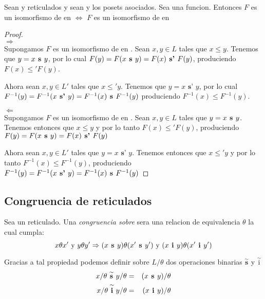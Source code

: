 \begin{lemma}
  Sean \reticulAlg y  reticulados y sean  y 
  los posets asociados. Sea  una funcion. Entonces $F$ es un isomorfismo de
  \reticulAlg en  $\iff$ $F$ es un isomorfismo de  en 
\end{lemma}
\begin{proof}
  ${}$\\
  $\Rightarrow$\\
  Supongamos $F$ es un isomorfismo de \reticulAlg en . Sean $x, y \in L$ tales que $x \leq y$.
  Tenemos que $y = x\textbf{ s }y$, por lo cual $F(y) = F(x\textbf{ s }y) = F(x) \textbf{ s' }F(y)$, produciendo $F(x) \leq' F(y)$.
  
  Ahora sean $x, y \in L'$ tales que $x \leq' y$. Tenemos que $y = x \textbf{ s' } y$, por lo cual $F^{-1}(y) = F^{-1}(x \textbf{ s' }y) = F^{-1}(x)\textbf{ s }F^{-1}(y)$
  produciendo $F^{-1}(x) \leq F^{-1}(y)$.

  $\Leftarrow$\\
  Supongamos $F$ es un isomorfismo de  en . Sean $x, y \in L$ tales que $y = x\textbf{ s }y$. Tenemos entonces
  que $x \leq y$ y por lo tanto $F(x) \leq' F(y)$, produciendo $F(y) = F(x\textbf{ s }y) = F(x) \textbf{ s' }F(y)$

  Ahora sean $x, y \in L'$ tales que $y = x \textbf{ s' } y$. Tenemos entonces que $x\leq'y$ y por lo tanto $F^{-1}(x) \leq F^{-1}(y)$, produciendo
  $F^{-1}(y) = F^{-1}(x \textbf{ s' }y) = F^{-1}(x)\textbf{ s }F^{-1}(y)$

\end{proof}

\subsection{Congruencia de reticulados}

\begin{definition}
  Sea \reticulAlg un reticulado. Una \emph{congruencia sobre} \reticulAlg sera una relacion de equivalencia
  $\theta$ la cual cumpla:
  $$
  x\theta x' \text{ y } y\theta y' \Rightarrow (x\textbf{ s }y)\theta(x'\textbf{ s }y') \text{ y } (x\textbf{ i }y)\theta(x'\textbf{ i }y')
  $$

  Gracias a tal propiedad podemos definir sobre $L/\theta$ dos operaciones binarias $\overset{\sim}{\textbf{s}}$ y $\overset{\sim}{\text{i}}$
  \begin{alignat*}{2}
    x/\theta\overset{\sim}{\textbf{ s }}y/\theta &=& (x\textbf{ s }y)/\theta\\
    x/\theta\overset{\sim}{\textbf{ i }}y/\theta &=& (x\textbf{ i }y)/\theta
  \end{alignat*}
\end{definition}

